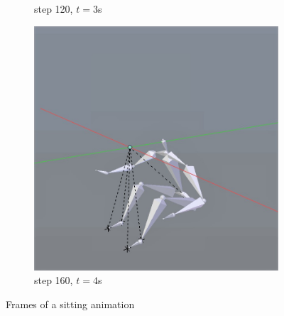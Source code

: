 \documentclass[10pt,twocolumn,letterpaper]{article}
\begin{document}
\begin{figure}
\begin{subfigure}{0.2\textwidth}
        \caption{step 120, $t=3$s}
    \end{subfigure}\begin{subfigure}{0.2\textwidth}
        \centering
        \includegraphics[width=.9\linewidth]{sit-4.jpg}
        \caption{step 160, $t=4$s}
    \end{subfigure}

    \caption{Frames of a sitting animation}
    \label{img:sit}
\end{figure}
\end{document}
